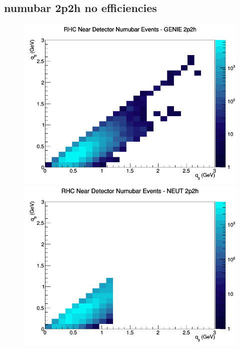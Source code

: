 \documentclass[12pt]{article}
\begin{document}
\subsection{numubar 2p2h no efficiencies}
\begin{figure}[h]
\includegraphics[width=\linewidth]{q0_q3/nominal/2p2h_RHC_ND_numubar_q3_q0_GENIE.png}
\endminipage
{}
\includegraphics[width=\linewidth]{q0_q3/nominal/2p2h_RHC_ND_numubar_q3_q0_NEUT.png}
\endminipage
{}

\end{figure}
\end{document}
